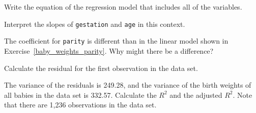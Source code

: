 {\begin{center}
\end{center}
\begin{parts}
\item Write the equation of the regression model that includes all of the 
variables.
\item Interpret the slopes of \texttt{gestation} and \texttt{age} in this 
context.
\item The coefficient for \texttt{parity} is different than in the linear 
model shown in Exercise~\ref{baby_weights_parity}. Why might there be a difference?
\item Calculate the residual for the first observation in the data set.
\item The variance of the residuals is 249.28, and the variance of the birth 
weights of all babies in the data set is 332.57. Calculate the $R^2$ and the 
adjusted $R^2$. Note that there are 1,236 observations in the data set.
\end{parts}
}{}

\D{\newpage}


